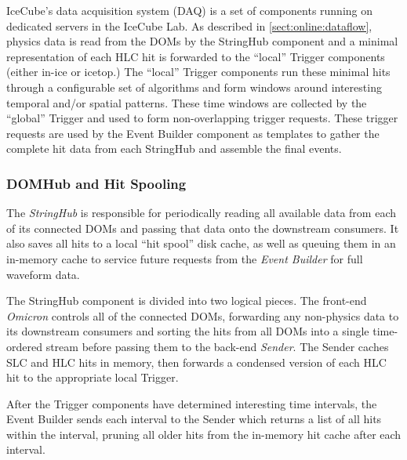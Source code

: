 IceCube's data acquisition system (DAQ) is a set of components running on
dedicated servers in the IceCube Lab.  As described in
\ref{sect:online:dataflow}, physics data is read from the DOMs by the StringHub
component and a minimal representation of each HLC hit is forwarded to the
``local'' Trigger components (either in-ice or icetop.)
The ``local'' Trigger components run these
minimal hits through a configurable set of algorithms and form windows around
interesting temporal and/or spatial patterns.  These time windows are collected
by the ``global'' Trigger and used to form non-overlapping trigger requests.
These trigger requests are used by the Event Builder component as templates to
gather the complete hit data from each StringHub and assemble the final events.

\subsubsection{DOMHub and Hit Spooling}

The \emph{StringHub} is responsible for periodically reading all available data
from each of its connected DOMs and passing that data onto the downstream
consumers.  It also saves all hits to a local ``hit spool'' disk cache, as
well as queuing them in an in-memory cache to service future requests from
the \emph{Event Builder} for full waveform data.

The StringHub component is divided into two logical pieces.  The front-end
\emph{Omicron} controls all of the connected DOMs, forwarding any
non-physics data to its downstream consumers and sorting the hits from all
DOMs into a single time-ordered stream
before passing them to the back-end \emph{Sender}.  The Sender
caches SLC and HLC hits in memory, then forwards a condensed version of
each HLC hit to the appropriate local Trigger.


After the Trigger components have determined interesting time intervals, the
Event Builder sends each interval to the Sender which returns a list
of all hits within the interval, pruning all older
hits from the in-memory hit cache after each interval.


